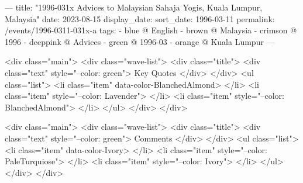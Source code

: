 ---
title: "1996-031x Advices to Malaysian Sahaja Yogis, Kuala Lumpur, Malaysia"
date: 2023-08-15
display_date: 
sort_date: 1996-03-11
permalink: /events/1996-0311-031x-a
tags:
  - blue @ English
  - brown @ Malaysia
  - crimson @ 1996
  - deeppink @ Advices
  - green @ 1996-03
  - orange @ Kuala Lumpur
---

<div class="main">
  <div class="wave-list">
    <div class="title">
      <div class="text" style="--color: green">
        Key Quotes
      </div>
    </div>
    <ul class="list">
        <li class="item" data-color-BlanchedAlmond>
        </li>
        <li class="item" style="--color: Lavender">
        </li>
        <li class="item" style="--color: BlanchedAlmond">
        </li>
      </ul>
  </div>
</div>

<div class="main">
  <div class="wave-list">
    <div class="title">
      <div class="text" style="--color: green">
        Comments
      </div>
    </div>
    <ul class="list">
        <li class="item" data-color-Ivory>
        </li>
        <li class="item" style="--color: PaleTurquiose">
        </li>
        <li class="item" style="--color: Ivory">
        </li>
      </ul>
  </div>
</div>
